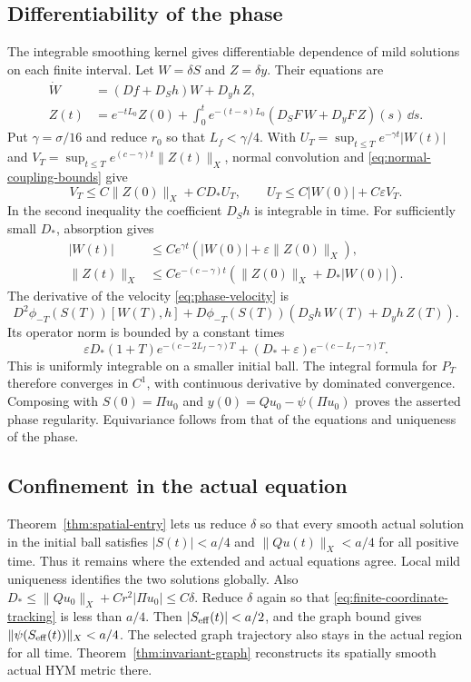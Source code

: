 \subsection{Differentiability of the phase}

The integrable smoothing kernel gives differentiable
dependence of mild solutions on each finite interval.
Let $W=\delta S$ and $Z=\delta y$. Their equations are
\[
 \begin{split}
 \dot W&=(Df+D_Sh)W+D_yh\,Z,\\
 Z(t)&=e^{-tL_0}Z(0)+\int_0^te^{-(t-s)L_0}
                     (D_SF\,W+D_yF\,Z)(s)\,\dd s.
 \end{split}
\]
Put $\gamma=\sigma/16$ and reduce $r_0$ so that
$L_f<\gamma/4$. With
$U_T=\sup_{t\le T}e^{-\gamma t}|W(t)|$ and
$V_T=\sup_{t\le T}e^{(c-\gamma)t}\|Z(t)\|_X$,
normal convolution and \eqref{eq:normal-coupling-bounds}
give
\[
 V_T\le C\|Z(0)\|_X+CD_*U_T,
 \qquad U_T\le C|W(0)|+C\varepsilon V_T.
\]
In the second inequality the coefficient $D_Sh$ is
integrable in time. For sufficiently small $D_*$,
absorption gives
\begin{equation}\label{eq:phase-variation-bounds}
 \begin{split}
 |W(t)|&\le Ce^{\gamma t}(|W(0)|+\varepsilon\|Z(0)\|_X),\\
 \|Z(t)\|_X&\le Ce^{-(c-\gamma)t}
                            (\|Z(0)\|_X+D_*|W(0)|).
 \end{split}
\end{equation}
The derivative of the velocity \eqref{eq:phase-velocity} is
\[
 D^2\phi_{-T}(S(T))[W(T),h]
      +D\phi_{-T}(S(T))(D_Sh\,W(T)+D_yh\,Z(T)).
\]
Its operator norm is bounded by a constant times
\[
 \varepsilon D_*(1+T)e^{-(c-2L_f-\gamma)T}
              +(D_*+\varepsilon)e^{-(c-L_f-\gamma)T}.
\]
This is uniformly integrable on a smaller initial ball.
The integral formula for $P_T$ therefore converges in
$C^1$, with continuous derivative by dominated convergence.
Composing with $S(0)=\Pi u_0$ and
$y(0)=Qu_0-\psi(\Pi u_0)$ proves the asserted phase
regularity. Equivariance follows from that of the
equations and uniqueness of the phase.

\subsection{Confinement in the actual equation}

Theorem~\ref{thm:spatial-entry} lets us reduce $\delta$
so that every smooth actual solution in the initial ball
satisfies $|S(t)|<a/4$ and $\|Qu(t)\|_X<a/4$ for all
positive time. Thus it remains where the extended and
actual equations agree. Local mild uniqueness identifies
the two solutions globally. Also
$D_*\le\|Qu_0\|_X+Cr^2|\Pi u_0|\le C\delta$.
Reduce $\delta$ again so that
\eqref{eq:finite-coordinate-tracking} is less than $a/4$.
Then $|S_{\rm eff}(t)|<a/2$, and the graph bound gives
$\|\psi(S_{\rm eff}(t))\|_X<a/4$. The selected graph
trajectory also stays in the actual region for all time.
Theorem~\ref{thm:invariant-graph} reconstructs its spatially
smooth actual HYM metric there.

